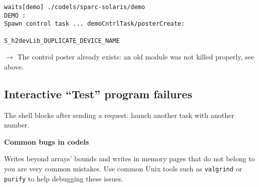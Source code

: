 \begin{center}\begin{cartouche}\small\begin{verbatim}
waits[demo] ./codels/sparc-solaris/demo
DEMO :
Spawn control task ... demoCntrlTask/posterCreate:
                                              S_h2devLib_DUPLICATE_DEVICE_NAME
\end{verbatim}\end{cartouche}\end{center}

$\rightarrow$ The  control poster already  exists: an  old module was not
killed properly, see above.


\subsection{Interactive ``Test'' program failures}

The shell  blocks   after sending  a  request: launch  another  task with
another number.



\bigbreak
\textbf{Common bugs in codels}

Writes beyond  arrays'  bounds and  writes  in memory  pages  that do not
belong to you are  very common mistakes.   Use common Unix tools such  as
\texttt{valgrind} or \texttt{purify} to help debugging these issues.
